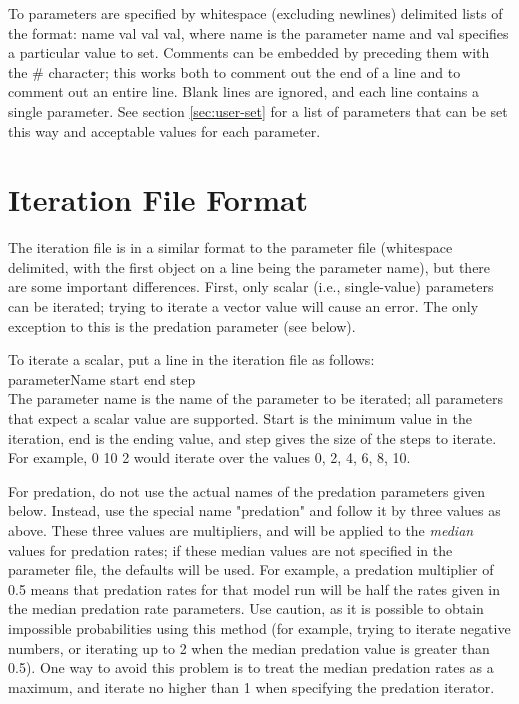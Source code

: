 \documentclass[12pt, english]{article}
\begin{document}
To parameters are specified by whitespace (excluding newlines) delimited lists of the format: name val val val, where name is the parameter name and val specifies a particular value to set. Comments can be embedded by preceding them with the \# character; this works both to comment out the end of a line and to comment out an entire line. Blank lines are ignored, and each line contains a single parameter. See section \ref{sec:user-set} for a list of parameters that can be set this way and acceptable values for each parameter.

\section{Iteration File Format}
The iteration file is in a similar format to the parameter file (whitespace delimited, with the first object on a line being the parameter name), but there are some important differences. First, only scalar (i.e., single-value) parameters can be iterated; trying to iterate a vector value will cause an error. The only exception to this is the predation parameter (see below).

To iterate a scalar, put a line in the iteration file as follows:\\
parameterName start end step\\
The parameter name is the name of the parameter to be iterated; all parameters that expect a scalar value are supported. Start is the minimum value in the iteration, end is the ending value, and step gives the size of the steps to iterate. For example, 0 10 2 would iterate over the values 0, 2, 4, 6, 8, 10.

For predation, do not use the actual names of the predation parameters given below. Instead, use the special name "predation" and follow it by three values as above. These three values are multipliers, and will be applied to the \emph{median} values for predation rates; if these median values are not specified in the parameter file, the defaults will be used. For example, a predation multiplier of 0.5 means that predation rates for that model run will be half the rates given in the median predation rate parameters. Use caution, as it is possible to obtain impossible probabilities using this method (for example, trying to iterate negative numbers, or iterating up to 2 when the median predation value is greater than 0.5). One way to avoid this problem is to treat the median predation rates as a maximum, and iterate no higher than 1 when specifying the predation iterator.
\end{document}
